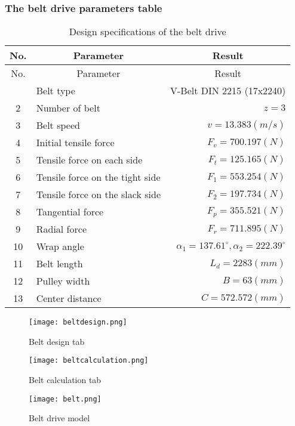 \subsubsection{The belt drive parameters table}
\begin{center}
	\begin{longtable}{clr}
		\toprule
		No. & \multicolumn{1}{c}{Parameter} & \multicolumn{1}{c}{Result}\\
		\midrule\endfirsthead
		\toprule
		No. & \multicolumn{1}{c}{Parameter} & \multicolumn{1}{c}{Result}\\
		\midrule\endhead
		\bottomrule\endfoot
		\bottomrule
		\caption{Design specifications of the belt drive}
		\endlastfoot
		1 & Belt type & V-Belt DIN 2215 (17x2240)\\
		2 & Number of belt & $ z=3 $\\
		3 & Belt speed & $ v=13.383\unit{(m/s)} $\\
		4 & Initial tensile force & $ F_v=700.197\unit{(N)} $\\
		5 & Tensile force on each side & $ F_t=125.165\unit{(N)} $\\
		6 & Tensile force on the tight side & $ F_1=553.254\unit{(N)} $\\
		7 & Tensile force on the slack side & $ F_2=197.734\unit{(N)} $\\
		8 & Tangential force & $ F_p=355.521\unit{(N)} $\\
		9 & Radial force  & $ F_r =711.895\unit{(N)}$\\
		10 & Wrap angle & $ \alpha_1 = 137.61^\circ, \alpha_2= 222.39^\circ $\\
		11 & Belt length & $ L_d=2283\unit{(mm)} $\\
		12 & Pulley width & $ B=63\unit{(mm)} $\\
		13 & Center distance & $ C=572.572\unit{(mm)} $\\
	\end{longtable}
\end{center}
\begin{figure}
	\centering
	\texttt{[image: beltdesign.png]}
	\caption{Belt design tab}
	\label{beltdesign}
\end{figure}
\begin{figure}
	\centering
	\texttt{[image: beltcalculation.png]}
	\caption{Belt calculation tab}
	\label{beltcalculation}
\end{figure}
\begin{figure}
	\centering
	\texttt{[image: belt.png]}
	\caption{Belt drive model}
	\label{belt}
\end{figure}

